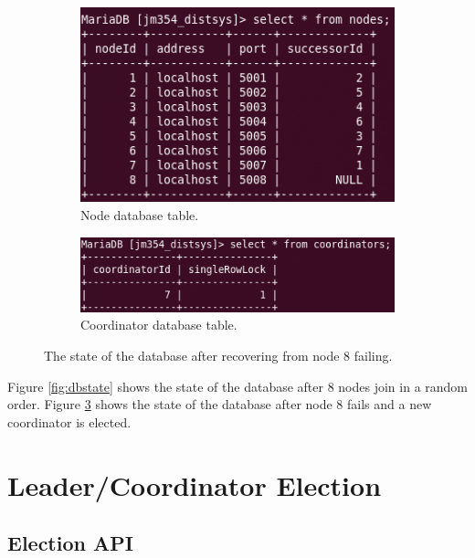 \documentclass[12pt]{article}
\begin{document}
\begin{figure}[!ht]
\centering
\begin{subfigure}{.5\textwidth}
  \centering
  \includegraphics[width=0.95\linewidth]{images/afterfailnodes}
  \caption{Node database table.}
  \label{fig:nodetableafterfail}
\end{subfigure}%
\begin{subfigure}{.5\textwidth}
  \centering
  \includegraphics[width=0.95\linewidth]{images/afterfailcoord}
  \caption{Coordinator database table.}
  \label{fig:coordtableafterfail}
\end{subfigure}
\caption{The state of the database after recovering from node 8 failing.}
\label{fig:dbstateafterfail}
\end{figure}

Figure \ref{fig:dbstate} shows the state of the database after 8 nodes join in a random order. Figure \ref{fig:dbstateafterfail} shows the state of the database after node 8 fails and a new coordinator is elected.


\section{Leader/Coordinator Election}

\subsection{Election API}
\end{document}
